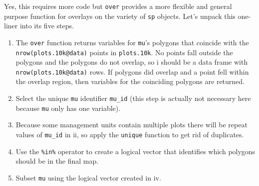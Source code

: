 \documentclass[
]{krantz}
\makeatletter
\newenvironment{Shaded}{\begin{snugshade}}{\end{snugshade}}
\newcommand{\FloatTok}[1]{\textcolor[rgb]{0.06,0.06,0.06}{#1}}
\newcommand{\KeywordTok}[1]{\textcolor[rgb]{0.27,0.27,0.27}{\textbf{#1}}}
\newcommand{\NormalTok}[1]{#1}
\newcommand{\OperatorTok}[1]{\textcolor[rgb]{0.43,0.43,0.43}{\textbf{#1}}}
\newcommand{\StringTok}[1]{\textcolor[rgb]{0.5,0.5,0.5}{#1}}
\providecommand{\tightlist}{%
  \setlength{\itemsep}{0pt}\setlength{\parskip}{0pt}}
\newenvironment{kframe}{%
\medskip{}
\setlength{\fboxsep}{.8em}
 \def\at@end@of@kframe{}%
 \ifinner\ifhmode%
  \def\at@end@of@kframe{\end{minipage}}%
  \begin{minipage}{\columnwidth}%
 \fi\fi%
 \def\FrameCommand##1{\hskip\@totalleftmargin \hskip-\fboxsep
 \colorbox{shadecolor}{##1}\hskip-\fboxsep
     \hskip-\linewidth \hskip-\@totalleftmargin \hskip\columnwidth}%
 \MakeFramed {\advance\hsize-\width
   \@totalleftmargin\z@ \linewidth\hsize
   \@setminipage}}%
 {\par\unskip\endMakeFramed%
 \at@end@of@kframe}
\renewenvironment{Shaded}{\begin{kframe}}{\end{kframe}}
\makeatother
\begin{document}
Yes, this requires more code but \texttt{over} provides a more flexible and general purpose function for overlays on the variety of \texttt{sp} objects. Let's unpack this one-liner into its five steps.

\begin{Shaded}
\end{Shaded}

\begin{enumerate}
\def\labelenumi{\roman{enumi}.}
\tightlist
\item
  The \texttt{over} function returns variables for \texttt{mu}'s polygons that coincide with the \texttt{nrow(plots.10k@data)} points in \texttt{plots.10k}. No points fall outside the polygons and the polygons do not overlap, so i should be a data frame with \texttt{nrow(plots.10k@data)} rows. If polygons did overlap and a point fell within the overlap region, then variables for the coinciding polygons are returned.
\item
  Select the unique \texttt{mu} identifier \texttt{mu\_id} (this step is actually not necessary here because \texttt{mu} only has one variable).
\item
  Because some management units contain multiple plots there will be repeat values of \texttt{mu\_id} in ii, so apply the \texttt{unique} function to get rid of duplicates.
\item
  Use the \texttt{\%in\%} operator to create a logical vector that identifies which polygons should be in the final map.
\item
  Subset \texttt{mu} using the logical vector created in iv.
\end{enumerate}
\end{document}
